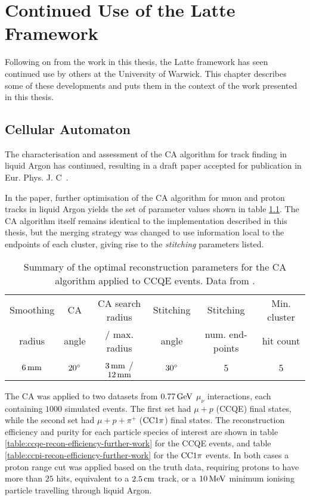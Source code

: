 \chapter{Continued Use of the Latte Framework}\label{appendix:other_uses}

Following on from the work in this thesis, the Latte framework has seen continued use by others at the University of Warwick. This chapter describes some of these developments and puts them in the context of the work presented in this thesis.

\section{Cellular Automaton}
The characterisation and assessment of the \ac{CA} algorithm for track finding in liquid Argon has continued, resulting in a draft paper accepted for publication in Eur. Phys. J. C~\citep{Back2013}.

In the paper, further optimisation of the CA algorithm for muon and proton tracks in liquid Argon yields the set of parameter values shown in table \ref{table:opt-params-further-work}. The CA algorithm itself remains identical to the implementation described in this thesis, but the merging strategy was changed to use information local to the endpoints of each cluster, giving rise to the \emph{stitching} parameters listed.

\begin{table}
\centering
\begin{tabular}{*{6}{c}}
Smoothing & CA    & CA search radius & Stitching & Stitching       & Min. cluster \\
radius    & angle & / max. radius    & angle     & num. end-points & hit count \\
\hline
\hline
$6\,\mathrm{mm}$ & $20^\circ$ & $3\,\mathrm{mm}$ / $12\,\mathrm{mm}$ & $30^\circ$ & $5$ & $5$ \\
\hline
\end{tabular}
\caption[CA reconstruction parameters for CCQE events]{\label{table:opt-params-further-work}Summary of the optimal reconstruction parameters for the CA algorithm applied to CCQE events. Data from \cite{Back2013}.}
\end{table}

The CA was applied to two datasets from $0.77\,\mathrm{GeV}$ $\mu_\nu$ interactions, each containing $1000$ simulated events. The first set had $\mu + p$ (CCQE) final states, while the second set had $\mu + p + \pi^+$ ($\mathrm{CC}1\pi$) final states. The reconstruction efficiency and purity for each particle species of interest are shown in table \ref{table:ccqe-recon-efficiency-further-work} for the CCQE events, and table \ref{table:ccpi-recon-efficiency-further-work} for the $\mathrm{CC}1\pi$ events. In both cases a proton range cut was applied based on the truth data, requiring protons to have more than $25$ hits, equivalent to a $2.5\,\mathrm{cm}$ track, or a $10\,\mathrm{MeV}$ minimum ionising particle travelling through liquid Argon.

